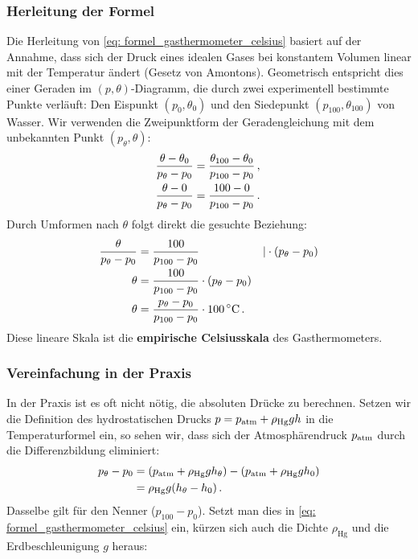 \subsubsection{Herleitung der Formel}
Die Herleitung von \cref{eq: formel_gasthermometer_celsius} basiert auf der Annahme, dass sich der Druck eines idealen Gases bei konstantem Volumen linear mit der Temperatur ändert (Gesetz von Amontons). Geometrisch entspricht dies einer Geraden im $(p, \theta)$-Diagramm, die durch zwei experimentell bestimmte Punkte verläuft: Den Eispunkt $(p_0, \theta_0)$ und den Siedepunkt $(p_{100}, \theta_{100})$ von Wasser. Wir verwenden die Zweipunktform der Geradengleichung mit dem unbekannten Punkt $(p_\theta, \theta)$:
\begin{equation}\begin{aligned}
    \frac{\theta - \theta_{0}}{p_\theta - p_{0}} &= \frac{\theta_{100} - \theta_{0}}{p_{100} - p_{0}} \,{,}\, \\
    \frac{\theta - 0}{p_\theta - p_0} &= \frac{100 - 0}{p_{100} - p_0} \,.
\end{aligned}\end{equation}
Durch Umformen nach $\theta$ folgt direkt die gesuchte Beziehung:
\begin{align}
    \frac{\theta}{p_\theta - p_0} &= \frac{100}{p_{100} - p_0} & | \cdot (p_\theta - p_0) \notag \\
    \theta &= \frac{100}{p_{100} - p_0} \cdot (p_\theta - p_0) \notag \\
    \theta &= \frac{p_\theta - p_0}{p_{100} - p_0} \cdot \SI{100}{\celsius} \,. \label{eq: herleitung_ende}
\end{align}
Diese lineare Skala ist die \textbf{empirische Celsiusskala} des Gasthermometers.
\subsubsection*{Vereinfachung in der Praxis}
In der Praxis ist es oft nicht nötig, die absoluten Drücke zu berechnen. Setzen wir die Definition des hydrostatischen Drucks $p = p_{\mathrm{atm}} + \rho_{\text{Hg}} g h$ in die Temperaturformel ein, so sehen wir, dass sich der Atmosphärendruck $p_{\mathrm{atm}}$ durch die Differenzbildung eliminiert:
\begin{align}
    p_\theta - p_0 &= (p_{\mathrm{atm}} + \rho_{\text{Hg}} g h_\theta) - (p_{\mathrm{atm}} + \rho_{\text{Hg}} g h_0) \notag \\
    &= \rho_{\text{Hg}} g (h_\theta - h_0) \,.
\end{align}
Dasselbe gilt für den Nenner ($p_{100} - p_0$). Setzt man dies in \cref{eq: formel_gasthermometer_celsius} ein, kürzen sich auch die Dichte $\rho_{\text{Hg}}$ und die Erdbeschleunigung $g$ heraus:

